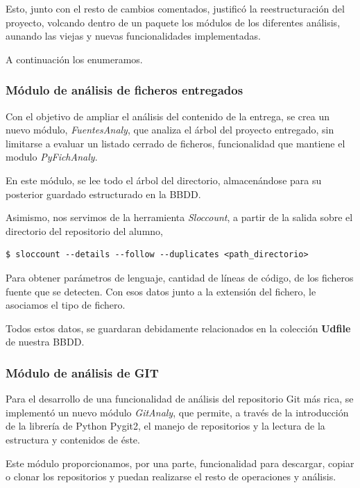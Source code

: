 Esto, junto con el resto de cambios comentados, justificó la reestructuración del proyecto, volcando dentro de un paquete los módulos de los diferentes análisis, aunando las viejas y nuevas funcionalidades implementadas.

A continuación los enumeramos.


\subsubsection{Módulo de análisis de ficheros entregados} 
\label{subsec:mod_anal_fich}

Con el objetivo de ampliar el análisis del contenido de la entrega, se crea un nuevo módulo, \textit{FuentesAnaly}, que analiza el árbol del proyecto entregado, sin limitarse a evaluar un listado cerrado de ficheros, funcionalidad que mantiene el modulo \textit{PyFichAnaly}.


En este módulo, se lee todo el árbol del directorio, almacenándose para su posterior guardado estructurado en la BBDD.


Asimismo, nos servimos de la herramienta \textit{Sloccount}, a partir de la salida sobre el directorio del repositorio del alumno,

\begin{center}
\begin{verbatim}
$ sloccount --details --follow --duplicates <path_directorio>
\end{verbatim}
\end{center}

Para obtener parámetros de lenguaje, cantidad de líneas de código, de los ficheros fuente que se detecten. Con esos datos junto a la extensión del fichero, le asociamos el tipo de fichero.


Todos estos datos, se guardaran debidamente relacionados en la colección \textbf{Udfile} de nuestra BBDD.

\subsubsection{Módulo de análisis de GIT} 
\label{subsec:mod_anal_git}

Para el desarrollo de una funcionalidad de análisis del repositorio Git más rica, se implementó un nuevo módulo \textit{GitAnaly}, que permite, a través de la introducción de la librería de Python Pygit2, el manejo de repositorios y la lectura de la estructura y contenidos de éste.


Este módulo proporcionamos, por una parte, funcionalidad para descargar, copiar o clonar los repositorios y puedan realizarse el resto de operaciones y análisis.


